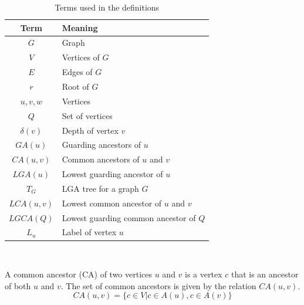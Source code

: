 \begin{table}[ht]
    \centering
	\captionsetup{justification=centering}
	\begin{tabular}{c l}
		\textbf{Term} & \textbf{Meaning} \\
		\hline 
		$G$ & Graph \\
		$V$ & Vertices of $G$\\
		$E$ & Edges of $G$\\
		$r$ & Root of $G$\\
		$u, v, w$& Vertices \\
		$Q$ & Set of vertices\\
		$\delta(v)$ & Depth of vertex $v$\\
		$GA(u)$ & Guarding ancestors of $u$\\
		$CA(u,v)$ & Common ancestors of $u$ and $v$\\
		$LGA(u)$ & Lowest guarding ancestor of $u$\\
		$T_G$ & LGA tree for a graph $G$\\
		$LCA(u,v)$ & Lowest common ancestor of $u$ and $v$\\
		$LGCA(Q)$ & Lowest guarding common ancestor of $Q$\\
		$L_u$ & Label of vertex $u$\\
	\end{tabular}\\
	\caption{Terms used in the definitions}
	\label{definitionsLegend}
\end{table}



\begin{definition} \label{def:commonAncestor}
	A common ancestor (CA) of two vertices $u$ and $v$ is a vertex $c$ that is an ancestor of both $u$ and $v$.
	The set of common ancestors is given by the relation $CA(u,v)$.
	\begin{equation*}
		CA(u,v) =	\{c \in V | c \in A(u) , c \in A(v)\}
	\end{equation*}
\end{definition}

